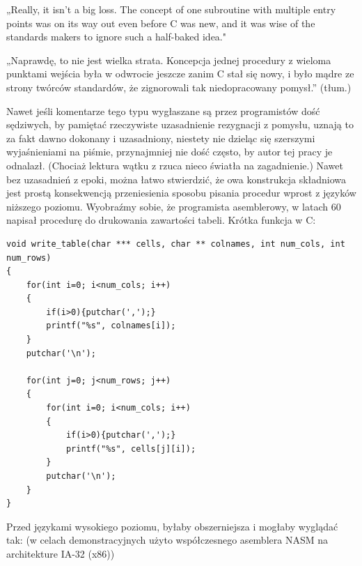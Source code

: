„Really, it isn't a big loss. The concept of one subroutine with multiple entry points was on its way out even before C was new, and it was wise of the standards makers to ignore such a half-baked idea."\cite{delreth_on_entry}

„Naprawdę, to nie jest wielka strata. Koncepcja jednej procedury z wieloma punktami wejścia była w odwrocie jeszcze zanim C stał się nowy, i było mądre ze strony twórców standardów, że zignorowali tak niedopracowany pomysł.” (tłum.)
 
Nawet jeśli komentarze tego typu wygłaszane są przez programistów dość sędziwych, by pamiętać rzeczywiste uzasadnienie rezygnacji z pomysłu, uznają to za fakt dawno dokonany i uzasadniony, niestety nie dzieląc się szerszymi wyjaśnieniami na piśmie, przynajmniej nie dość często, by autor tej pracy je odnalazł. (Chociaż lektura wątku z \cite{delreth_on_entry} rzuca nieco światła na zagadnienie.)
Nawet bez uzasadnień z epoki, można łatwo stwierdzić, że owa konstrukcja składniowa jest prostą konsekwencją przeniesienia sposobu pisania procedur wprost z języków niższego poziomu. Wyobraźmy sobie, że programista asemblerowy, w latach 60 napisał procedurę do drukowania zawartości tabeli. Krótka funkcja w C:

\begin{lstlisting}
void write_table(char *** cells, char ** colnames, int num_cols, int num_rows)
{
    for(int i=0; i<num_cols; i++)
    {
        if(i>0){putchar(',');}
        printf("%s", colnames[i]);
    }
    putchar('\n');
    
    for(int j=0; j<num_rows; j++)
    {
        for(int i=0; i<num_cols; i++)
        {
            if(i>0){putchar(',');}
            printf("%s", cells[j][i]);
        }
        putchar('\n');
    }
}
\end{lstlisting}

Przed językami wysokiego poziomu, byłaby obszerniejsza i mogłaby wyglądać tak:
(w celach demonstracyjnych użyto współczesnego asemblera NASM na architekture IA-32 (x86))

